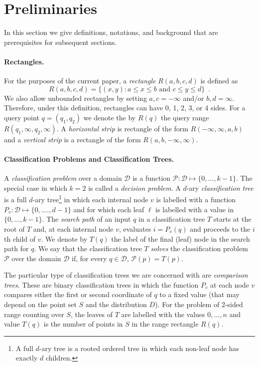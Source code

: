 \documentclass[lotsofwhite,charterfonts]{patmorin}
\begin{document}
\section{Preliminaries}


In this section we give definitions, notations, and background
that are prerequisites for subsequent sections.

\paragraph{Rectangles.}

For the purposes of the current paper, a \emph{rectangle}
$R(a,b,c,d)$ is defined as
\[
    R(a,b,c,d) = \{ (x,y) : \mbox{$a\le  x \le b$ and $c \le y \le d$}\}
	\enspace .
\]
We also allow unbounded rectangles by setting $a,c=-\infty$ and/or
$b,d=\infty$.  Therefore, under this definition, rectangles can have
0, 1, 2, 3, or 4 sides.  For a query point $q=(q_1,q_2)$ we denote the
by $R(q)$ the query range $R(q_1,\infty,q_2,\infty)$.  A
\emph{horizontal strip} is rectangle of the form
$R(-\infty,\infty,a,b)$ and a \emph{vertical strip} is a rectangle of
the form $R(a,b,-\infty,\infty)$.

\paragraph{Classification Problems and Classification Trees.}

A \emph{classification problem} over a domain $\mathcal{D}$ is a
function $\mathcal{P}:\mathcal{D}\mapsto \{0,\ldots,k-1\}$.  The
special case in which $k=2$ is called a \emph{decision problem}.  A
$d$-ary \emph{classification tree} is a full $d$-ary tree\footnote{A
full $d$-ary tree is a rooted ordered tree in which each non-leaf node
has exactly $d$ children.} in which each internal node $v$ is labelled
with a function $P_v:\mathcal{D}\mapsto\{0,.\ldots,d-1\}$ and for
which each leaf $\ell$ is labelled with a value
in $\{0,\ldots,k-1\}$. The \emph{search path} of an input $q$
in a classification tree $T$ starts at the root of $T$ and, at each
internal node $v$, evaluates $i=P_v(q)$ and proceeds to the $i$th
child of $v$.  We denote by $T(q)$ the label of the final (leaf) node
in the search path for $q$.  We say that the classification tree $T$
\emph{solves} the classification problem $\mathcal{P}$ over the domain
$\mathcal{D}$ if, for every $q\in \mathcal{D}$, $\mathcal{P}(p)=T(p)$.

The particular type of classification trees we are concerned with are
\emph{comparison trees}.  These are binary classification trees in
which the function $P_v$ at each node $v$ compares either the first or
second coordinate of $q$ to a fixed value (that may depend on the
point set $S$ and the distribution $D$).  For the problem of 2-sided
range counting over $S$, the leaves of $T$ are labelled with the
values $0,\ldots,n$ and value $T(q)$ is the number of points in $S$ in
the range rectangle $R(q)$.
\end{document}
